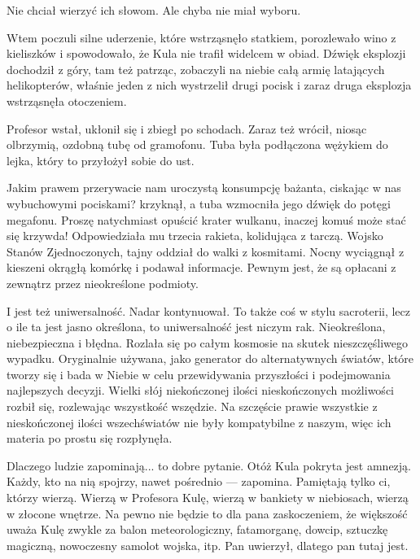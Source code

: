 Nie chciał wierzyć ich słowom. Ale chyba nie miał wyboru.

Wtem poczuli silne uderzenie, które wstrząsnęło statkiem, porozlewało wino z kieliszków i spowodowało, że Kula nie trafił widelcem w obiad.
Dźwięk eksplozji dochodził z góry, tam też patrząc, zobaczyli na niebie całą armię latających helikopterów, właśnie jeden z nich wystrzelił drugi pocisk i zaraz druga eksplozja wstrząsnęła otoczeniem.

Profesor wstał, ukłonił się i zbiegł po schodach. Zaraz też wrócił, niosąc olbrzymią, ozdobną tubę od gramofonu. Tuba była podłączona wężykiem do lejka, który to przyłożył sobie do ust.

\begin{dialogue}
\ds{} Jakim prawem przerywacie nam uroczystą konsumpcję bażanta, ciskając w nas wybuchowymi pociskami? \dm{}
krzyknął, a tuba wzmocniła jego dźwięk do potęgi megafonu. \dm{}
Proszę natychmiast opuścić krater wulkanu, inaczej komuś może stać się krzywda! \dm{} Odpowiedziała mu trzecia rakieta, kolidująca z tarczą.
\ds{} Wojsko Stanów Zjednoczonych, tajny oddział do walki z kosmitami. \dm{} Nocny wyciągnął z kieszeni okrągłą komórkę i podawał informacje. \dm{} Pewnym jest, że są opłacani z zewnątrz przez nieokreślone podmioty.

\end{dialogue}



  











\ds{} I jest też uniwersalność. \dm{} Nadar kontynuował. \dm{} To także coś w stylu sacroterii, lecz o ile ta jest jasno określona, to uniwersalność jest niczym rak.
Nieokreślona, niebezpieczna i błędna. Rozlała się po całym kosmosie na skutek nieszczęśliwego wypadku. 
Oryginalnie używana, jako generator do alternatywnych światów, które tworzy się i bada w Niebie w celu przewidywania przyszłości i podejmowania najlepszych decyzji. Wielki słój niekończonej ilości nieskończonych możliwości rozbił się, rozlewając wszystkość wszędzie. Na szczęście prawie wszystkie z nieskończonej ilości wszechświatów nie były kompatybilne z naszym, więc ich materia po prostu się rozpłynęła.








Dlaczego ludzie zapominają... to dobre pytanie.
Otóż Kula pokryta jest amnezją. Każdy, kto na nią spojrzy, nawet pośrednio --- zapomina.
Pamiętają tylko ci, którzy wierzą. Wierzą w Profesora Kulę, wierzą w bankiety w niebiosach, wierzą w złocone wnętrze.
Na pewno nie będzie to dla pana zaskoczeniem, że większość uważa Kulę zwykle za balon meteorologiczny, fatamorganę, dowcip, sztuczkę magiczną, nowoczesny samolot wojska, itp.
Pan uwierzył, dlatego pan tutaj jest.






